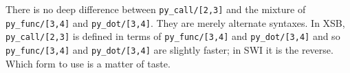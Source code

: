 There is no deep difference between {\tt py\_call/[2,3]} and the
mixture of {\tt py\_func/[3,4]} and {\tt py\_dot/[3,4]}. They are
merely alternate syntaxes.  In XSB, {\tt py\_call/[2,3]} is defined in
terms of {\tt py\_func/[3,4]} and {\tt py\_dot/[3,4]} and so {\tt
  py\_func/[3,4]} and {\tt py\_dot/[3,4]} are slightly faster; in SWI
it is the reverse.  Which form to use is a matter of taste.


%
%

